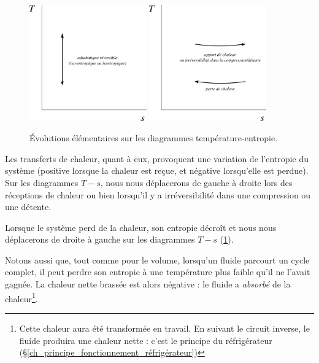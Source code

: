 		\begin{figure}
			\begin{center}
				\includegraphics[width=0.45\textwidth]{images/ts_basics_1.png}
				\includegraphics[width=0.45\textwidth]{images/ts_basics_2.png}
			\end{center}
			\caption{Évolutions élémentaires sur les diagrammes température-entropie.}
			\label{fig_ts_basics}
		\end{figure}

		Les transferts de chaleur, quant à eux, provoquent une variation de l’entropie du système (positive lorsque la chaleur est reçue, et négative lorsqu’elle est perdue). Sur les diagrammes $T-s$, nous nous déplacerons de gauche à droite lors des réceptions de chaleur ou bien lorsqu’il y a irréversibilité dans une compression ou une détente.

		Lorsque le système perd de la chaleur, son entropie décroît et nous nous déplacerons de droite à gauche sur les diagrammes $T-s$ (\cref{fig_ts_basics}).

		\clearfloats
		Notons aussi que, tout comme pour le volume, lorsqu’un fluide parcourt un cycle complet, il peut perdre son entropie à une température plus faible qu’il ne l’avait gagnée. La chaleur nette brassée est alors négative : le fluide a \emph{absorbé} de la chaleur\footnote{Cette chaleur aura été transformée en travail. En suivant le circuit inverse, le fluide produira une chaleur nette : c’est le principe du réfrigérateur (\S\ref{ch_principe_fonctionnement_réfrigérateur})}.


